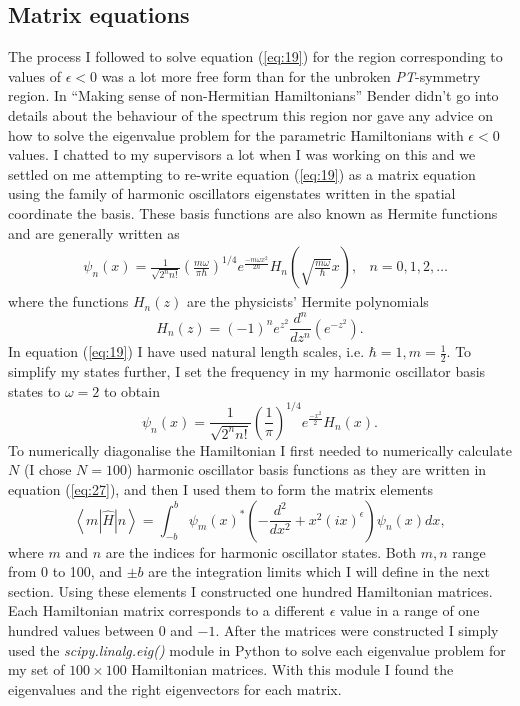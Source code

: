 \documentclass[10pt, a4paper, singlespacing]{report}
\newcommand\PT{\emph{PT}}
\begin{document}
\subsection{Matrix equations}\label{Matrix equations}
The process I followed to solve equation (\ref{eq:19}) for the region corresponding to values of $\epsilon < 0$ was a lot more free form than for the unbroken \PT-symmetry region. In ``Making sense of non-Hermitian Hamiltonians'' Bender didn't go into details about the behaviour of the spectrum this region nor gave any advice on how to solve the eigenvalue problem for the parametric Hamiltonians with $\epsilon < 0$ values. I chatted to my supervisors a lot when I was working on this and we settled on me attempting to re-write equation (\ref{eq:19}) as a matrix equation using the family of harmonic oscillators eigenstates written in the spatial coordinate the basis. These basis functions are also known as Hermite functions and are generally written as
\begin{align} \label{eq:25}
&\psi_n(x)= \frac{1}{\sqrt{2^n n!}} 
\left ( \frac{m \omega}{\pi \hbar}\right )^{1/4} e^{\frac{-m \omega x^2}{2 \hbar}}
H_n \left (\sqrt{\frac{m \omega}{\hbar}}x\right ), &n = 0, 1, 2, \dots
\end{align}
where the functions $H_n(z)$ are the physicists' Hermite polynomials
\begin{equation} \label{eq:26}
H_n(z) = (-1)^n e^{z^2} \frac{d^n}{dz^n}\left( e^{-z^2}\right).
\end{equation}
In equation (\ref{eq:19}) I have used natural length scales, i.e. $\hbar = 1, m = \frac{1}{2}$. To simplify my states further, I set the frequency in my harmonic oscillator basis states to $\omega = 2$ to obtain
\begin{equation} \label{eq:27}
\psi_n(x)= \frac{1}{\sqrt{2^n n!}} 
\left ( \frac{1}{\pi}\right )^{1/4} e^{\frac{-x^2}{2}}
H_n (x).
\end{equation}
To numerically diagonalise the Hamiltonian I first needed to numerically calculate $N$ (I chose $N = 100$) harmonic oscillator basis functions as they are written in equation (\ref{eq:27}), and then I used them to form the matrix elements 
\begin{equation}\label{eq:28}
\left \langle m \left |\hat{H} \right|n \right \rangle = \int_{-b}^{b} \psi_m(x)^* \left ( - \frac{d^2}{dx^2} + x^2(ix)^{\epsilon}\right ) \psi_n(x) dx,
\end{equation}
where $m$ and $n$ are the indices for harmonic oscillator states. Both $m, n$ range from 0 to 100, and $\pm b$ are the integration limits which I will define in the next section. Using these elements I constructed one hundred Hamiltonian matrices. Each Hamiltonian matrix corresponds to a different $\epsilon$ value in a range of one hundred values between $0$ and $-1$. 
After the matrices were constructed I simply used the \emph{scipy.linalg.eig()} module in Python to solve each eigenvalue problem for my set of $100\times100$ Hamiltonian matrices. With this module I found the eigenvalues and the right eigenvectors for each matrix.
\end{document}
